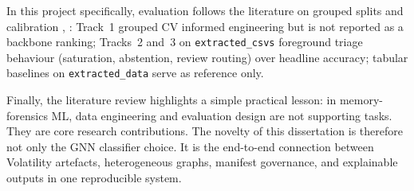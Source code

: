 In this project specifically, evaluation follows the literature on grouped splits and calibration \cite{sommer2010outside}, \cite{guo2017calibration}: Track~1 grouped CV informed engineering but is not reported as a backbone ranking; Tracks~2 and~3 on \texttt{extracted\_csvs} foreground triage behaviour (saturation, abstention, review routing) over headline accuracy; tabular baselines on \texttt{extracted\_data} serve as reference only.

Finally, the literature review highlights a simple practical lesson: in memory-forensics ML, data engineering and evaluation design are not supporting tasks. They are core research contributions. The novelty of this dissertation is therefore not only the GNN classifier choice. It is the end-to-end connection between Volatility artefacts, heterogeneous graphs, manifest governance, and explainable outputs in one reproducible system.

